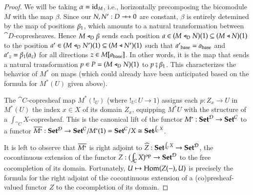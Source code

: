 \documentclass{amsart}
\begin{document}
\begin{proof}
  We will be taking $\alpha = \mathrm{id}_M$, i.e., horizontally precomposing
  the bicomodule $M$ with the map $\beta$. Since our $N, N': D \bim 0$
  are constant, $\beta$ is entirely detemined by the map of positions
  ${\beta}_1$, which amounts to a natural transformation between
  $\cat{D}$-copresheaves. Hence $M \mathrel{\triangleleft}_D \beta$ sends each position
  $a \in (M \mathrel{\triangleleft}_D N)(1) \subseteq (M \mathrel{\triangleleft} N)(1)$ to the
  position $a' \in (M \mathrel{\triangleleft}_D N')(1) \subseteq (M \mathrel{\triangleleft} N')(1)$
  such that ${a'}_{\mathrm{base}} = a_{\mathrm{base}}$ and
  ${a'}_z = {\beta}_1(a_z)$ for all directions
  $z \in M[a_{\mathrm{base}}]$. In other words, it is the map that sends a
  natural transformation $p \in P = (M \mathrel{\triangleleft}_D N)(1)$ to
  $p \fatsemi {\beta}_1$. This characterizes the behavior of
  $M^*$ on maps (which could already have been anticipated based on
  the formula for $M^*(U)$ given above).

  The $\cat{C}$-copresheaf map $M^*(!_U)$ (where $!_U: U \to 1$)
  assigns each $p: Z_x \to U$ in $M^*(U)$ the index $x \in X$ of its
  domain $Z_x$, equipping $M^*U$ with the structure of a
  $\int_{\cat{C}}X$-copresheaf. This is the canonical lift of the
  functor $M^*: {\normalfont\mathbf{Set}}^{\mathcal{D}} \to {\normalfont\mathbf{Set}}^{\mathcal{C}}$ to a functor
  $\overline{M^*}: {\normalfont\mathbf{Set}}^{\mathcal{D}} \to {\normalfont\mathbf{Set}}^{\mathcal{C}}/M^*(1) =
  {\normalfont\mathbf{Set}}^{\mathcal{C}}/X \cong {\normalfont\mathbf{Set}}^{\int_{\mathcal{C}}X}$.

  It is left to observe that $\overline{M^*}$ is right adjoint to
  $\widehat{Z}: {\normalfont\mathbf{Set}}^{\int_{\mathcal{C}}X} \to {\normalfont\mathbf{Set}}^{\mathcal{D}}$, the
  cocontinuous extension of the functor
  $Z: (\int_{\mathcal{C}}X)^{\mathrm{op}} \to {\normalfont\mathbf{Set}}^{\mathcal{D}}$ to the free
  cocompletion of its domain. Fortunately, $U \mapsto \operatorname{Hom}(Z(-),U)$ is
  precisely the formula for the right adjoint of the cocontinuous
  extension of a (co)presheaf-valued functor $Z$ to the cocompletion of
  its domain.
\end{proof}
\end{document}
